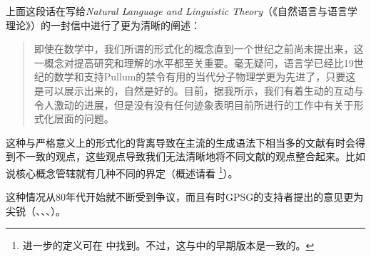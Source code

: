上面这段话在写给\emph{Natural Language and Linguistic Theory}（《自然语言与语言学理论》）的一封信中进行了更为清晰的阐述：
\begin{quote}
即使在数学中，我们所谓的形式化的概念直到一个世纪之前尚未提出来，这一概念对提高研究和理解的水平都至关重要。毫无疑问，语言学已经比19世纪的数学和支持Pullum的禁令有用的当代分子物理学更为先进了，只要这是可以展示出来的，自然是好的。目前，据我所示，我们有着生动的互动与令人激动的进展，但是没有没有任何迹象表明目前所进行的工作中有关于形式化层面的问题。 \citep[]{Chomsky90a}
\end{quote}
这种与严格意义上的形式化的背离导致在主流的生成语法下相当多的文献有时会得到不一致的观点，这些观点导致我们无法清晰地将不同文献的观点整合起来。比如说核心概念管辖就有几种不同的界定（概述请看\citealp{AS83a} \footnote{%
进一步的定义可在 中找到。不过，这与\citet[--106]{PP86a}中的早期版本是一致的。%
}）。

这种情况从80年代开始就不断受到争议，而且有时GPSG的支持者提出的意见更为尖锐（\citealp*[]{GKPS85a}、\citealp{Pullum85a,Pullum89b}、\citealp[]{Pullum91b}、\citealp{KP90a}）。

